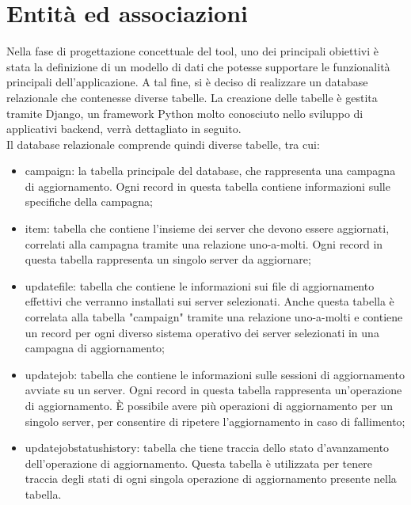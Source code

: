 \section{Entità ed associazioni}
Nella fase di progettazione concettuale del tool, uno dei principali
obiettivi è stata la definizione di un modello di dati che potesse 
supportare le funzionalità principali dell'applicazione.
A tal fine, si è deciso di realizzare un database relazionale che 
contenesse diverse tabelle. La creazione delle tabelle è gestita 
tramite Django, un framework Python molto conosciuto nello sviluppo di 
applicativi backend, verrà dettagliato in seguito.\\

Il database relazionale comprende quindi diverse tabelle, tra cui:
\begin{itemize}
\item campaign: la tabella principale del database, che rappresenta una 
campagna di aggiornamento. Ogni record in questa tabella contiene 
informazioni sulle specifiche della campagna;
\item item: tabella che contiene l'insieme dei server che devono essere 
aggiornati, correlati alla campagna tramite una relazione uno-a-molti. 
Ogni record in questa tabella rappresenta un singolo server da aggiornare;
\item updatefile: tabella che contiene le informazioni sui file di aggiornamento 
effettivi che verranno installati sui server selezionati. 
Anche questa tabella è correlata alla tabella "campaign" tramite una 
relazione uno-a-molti e contiene un record per ogni diverso sistema 
operativo dei server selezionati in una campagna di aggiornamento;
\item updatejob: tabella che contiene le informazioni sulle sessioni 
di aggiornamento avviate su un server. Ogni record in questa tabella 
rappresenta un'operazione di aggiornamento. È possibile avere più operazioni 
di aggiornamento per un singolo server, per consentire di ripetere 
l’aggiornamento in caso di fallimento;
\item updatejobstatushistory: tabella che tiene traccia dello stato d'avanzamento dell’operazione di aggiornamento. Questa tabella è utilizzata 
per tenere traccia degli stati di ogni singola operazione di aggiornamento 
presente nella tabella.
\end{itemize}

